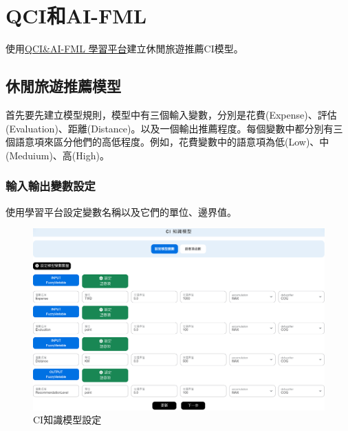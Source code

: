 \chapter{QCI和AI-FML}

使用\href{https://kws.oaselab.org/qciai/}{QCI\&AI-FML 學習平台}建立休閒旅遊推薦CI模型。
\section{休閒旅遊推薦模型}
首先要先建立模型規則，模型中有三個輸入變數，分別是花費(Expense)、評估(Evaluation)、距離(Distance)。以及一個輸出推薦程度。每個變數中都分別有三個語意項來區分他們的高低程度。例如，花費變數中的語意項為低(Low)、中(Meduium)、高(High)。 \\

\subsection{輸入輸出變數設定}
使用學習平台設定變數名稱以及它們的單位、邊界值。
\begin{figure}[htbp!]
    \centering
    \includegraphics[width=0.6\linewidth]{images/w4/CI_knowledge.png}
    \caption{CI知識模型設定}
    \label{fig:CI-knowledge}
\end{figure}
\newpage

